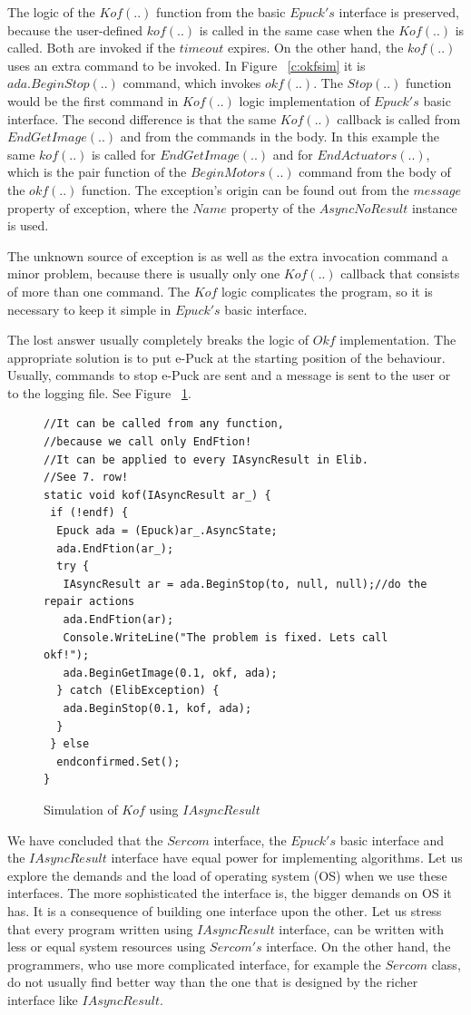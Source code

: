\documentclass[12pt,notitlepage]{report}
\begin{document}
	The logic of the $Kof(..)$ function from the basic $Epuck's$ interface is preserved, because the user-defined
	$kof(..)$ is called in the same case when the $Kof(..)$ is called. Both are invoked if the $timeout$ expires.
	On the other hand, the $kof(..)$ uses an extra command to be invoked. In Figure ~\ref{c:okfsim} it
	is $ada.BeginStop(..)$ command, which invokes $okf(..)$. The $Stop(..)$ function would be the first command
	in $Kof(..)$ logic implementation of $Epuck's$ basic interface.
	The second difference is that the same $Kof(..)$ callback is called from $EndGetImage(..)$ and from the
	commands in the body. In this example the same $kof(..)$ is called for $EndGetImage(..)$ and 
	for $EndActuators(..)$, which is the pair function of the $BeginMotors(..)$ 
	command from the body of the $okf(..)$ function.
	The exception's origin can be found out from the $message$ property of exception, 
	where the $Name$ property of the $AsyncNoResult$ instance is used.

	The unknown source of exception is as well as the extra invocation command a minor problem, because
	there is usually only one $Kof(..)$ callback that consists of more than one command. 
	The $Kof$ logic complicates the program, so it is necessary to keep it simple in $Epuck's$ basic interface.

	The lost answer usually completely breaks the logic of $Okf$ implementation.
	The appropriate solution is to put e-Puck
	at the starting position of the behaviour. Usually, commands to stop e-Puck are sent 
	and a message is sent to the user or to the logging file.
	See Figure ~\ref{iasynckof}.

\begin{figure}[!hbp]
\begin{lstlisting}
//It can be called from any function,
//because we call only EndFtion!
//It can be applied to every IAsyncResult in Elib.
//See 7. row!
static void kof(IAsyncResult ar_) {
 if (!endf) {
  Epuck ada = (Epuck)ar_.AsyncState;
  ada.EndFtion(ar_);
  try {
   IAsyncResult ar = ada.BeginStop(to, null, null);//do the repair actions
   ada.EndFtion(ar);
   Console.WriteLine("The problem is fixed. Lets call okf!");
   ada.BeginGetImage(0.1, okf, ada);
  } catch (ElibException) {
   ada.BeginStop(0.1, kof, ada);
  }
 } else
  endconfirmed.Set();
}
\end{lstlisting}
\caption{Simulation of $Kof$ using $IAsyncResult$}
\label{iasynckof}
\end{figure}

	We have concluded that the $Sercom$ interface, the $Epuck's$ basic interface and 
	the $IAsyncResult$ interface have equal power for implementing algorithms.
	Let us explore the demands and the load of operating system (OS) when we use these interfaces.
	The more sophisticated the interface is, the bigger demands on OS it has.
	It is a consequence of building one interface upon the other.
	Let us stress that every program written using $IAsyncResult$ interface, 
	can be written with less or equal system resources using $Sercom's$
	interface. On the other hand, the programmers, 
	who use more complicated interface, for example the $Sercom$ class, do not usually find better way 
	than the one that is designed by the richer interface like $IAsyncResult$.
\end{document}
